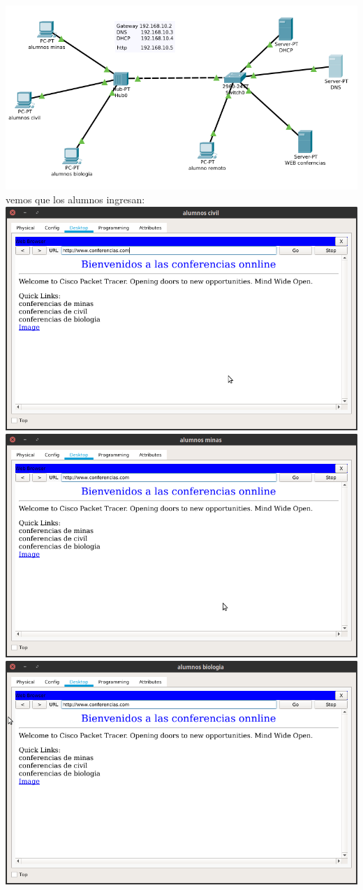 \includegraphics[scale=0.5]{img/confe.png} 
\\ vemos que los alumnos ingresan:\\
\includegraphics[scale=0.5]{img/civil.png} 
\includegraphics[scale=0.5]{img/minas.png} 
\includegraphics[scale=0.5]{img/biologia.png} 
